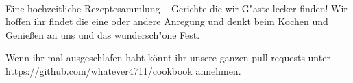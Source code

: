 \documentclass[%
a4paper,
twoside,
12pt
]{article}
\begin{document}
\begin{otherlanguage}{ngerman}





\end{otherlanguage}

\clearpage
~\thispagestyle{empty}
\clearpage
\thispagestyle{empty}
~
\vfill
\begin{center}
\end{center}


    Eine hochzeitliche Rezeptesammlung -- Gerichte die wir G"aste lecker finden! Wir hoffen ihr findet die eine oder andere Anregung und denkt beim Kochen und Genießen an uns und das wundersch"one Fest.
    
    Wenn ihr mal ausgeschlafen habt könnt ihr unsere ganzen pull-requests unter \url{https://github.com/whatever4711/cookbook} annehmen.
\end{document}
